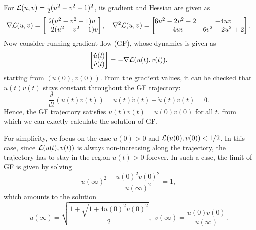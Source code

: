 For ${\mathcal{L}}(u,v) = \frac{1}{2}(u^2-v^2-1)^2$, its gradient and Hessian are given as
\begin{equation}
\label{eq:LDNlossgH}
    \nabla {\mathcal{L}}(u,v) = 
    \begin{bmatrix}
    2(u^2-v^2-1)u \\ -2(u^2-v^2-1)v
    \end{bmatrix},\quad
    \nabla^2 {\mathcal{L}}(u,v) = 
    \begin{bmatrix}
        6u^2 - 2v^2-2 & -4uv \\
        -4uv & 6v^2 - 2u^2 + 2
    \end{bmatrix}.
\end{equation}
Now consider running gradient flow (GF), whose dynamics is given as
\begin{equation*}
    \begin{bmatrix}
        \dot u(t) \\ \dot v(t) 
    \end{bmatrix}
    =
    - \nabla {\mathcal{L}}(u(t),v(t)),
\end{equation*}
starting from $(u(0),v(0))$. From the gradient values, it can be checked that $u(t)v(t)$ stays constant throughout the GF trajectory:
\begin{equation*}
    \frac{d}{dt} (u(t) v(t)) = u(t) \dot v(t) + \dot u(t) v(t) = 0.
\end{equation*}
Hence, the GF trajectory satisfies $u(t) v(t) = u(0) v(0)$ for all $t$, from which we can exactly calculate the solution of GF.

For simplicity, we focus on the case $u(0) > 0$ and ${\mathcal{L}}(u(0), v(0)) < 1/2$. In this case, since ${\mathcal{L}}(u(t),v(t))$ is always non-increasing along the trajectory, the trajectory has to stay in the region $u(t) > 0$ forever. In such a case, the limit of GF is given by solving
\begin{equation*}
    u(\infty)^2 - \frac{u(0)^2 v(0)^2}{u(\infty)^2} = 1,
\end{equation*}
which amounts to the solution
\begin{equation}
\label{eq:LDNGFsol}
    u(\infty) = \sqrt{\frac{1+\sqrt{1+4u(0)^2v(0)^2}}{2}},~~
    v(\infty) = \frac{u(0) v(0)}{u(\infty)}.
\end{equation}

